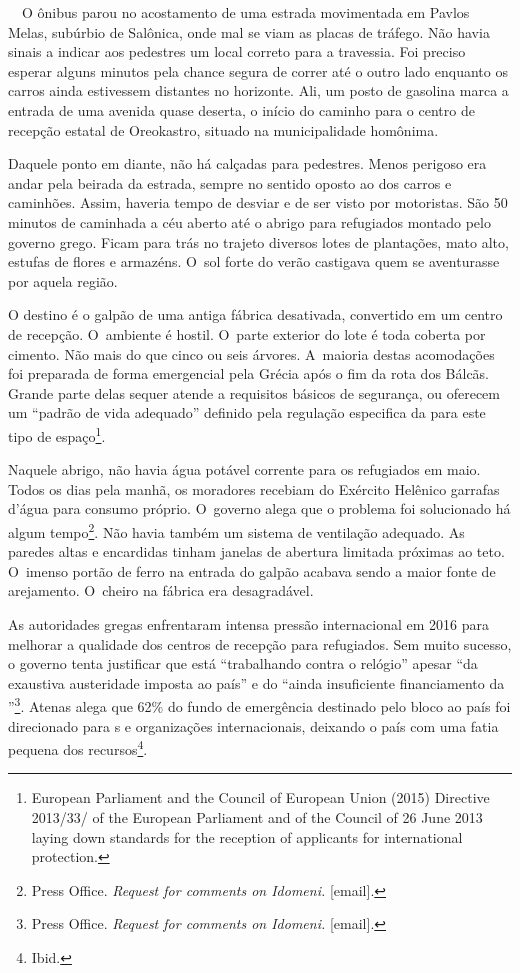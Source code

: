  
\ \
O ônibus parou no acostamento de uma estrada movimentada em Pavlos
Melas, subúrbio de Salônica, onde mal se viam as placas de tráfego. Não
havia sinais a indicar aos pedestres um local correto para a travessia.
Foi preciso esperar alguns minutos pela chance segura de correr até o
outro lado enquanto os carros ainda estivessem distantes no horizonte.
Ali, um posto de gasolina marca a entrada de uma avenida quase deserta,
o início do caminho para o centro de recepção estatal de Oreokastro,
situado na municipalidade homônima.

Daquele ponto em diante, não há calçadas para pedestres. Menos perigoso
era andar pela beirada da estrada, sempre no sentido oposto ao dos
carros e caminhões. Assim, haveria tempo de desviar e de ser visto por
motoristas. São 50 minutos de caminhada a céu aberto até o abrigo para
refugiados montado pelo governo grego. Ficam para trás no trajeto
diversos lotes de plantações, mato alto, estufas de flores e armazéns. O~sol forte do verão castigava quem se aventurasse por aquela região.

O destino é o galpão de uma antiga fábrica desativada, convertido em um
centro de recepção. O~ambiente é hostil. O~parte exterior do lote é toda
coberta por cimento. Não mais do que cinco ou seis árvores. A~maioria
destas acomodações foi preparada de forma emergencial pela Grécia após o
fim da rota dos Bálcãs. Grande parte delas sequer atende a requisitos
básicos de segurança, ou oferecem um ``padrão de vida adequado''
definido pela regulação especifica da \versal{UE} para este tipo de
espaço\footnote{ European Parliament and the Council of European
Union (2015) Directive 2013/33/\versal{EU} of the European Parliament and of the
Council of 26 June 2013 laying down standards for the reception of
applicants for international protection.}.

Naquele abrigo, não havia água potável corrente para os refugiados em
maio. Todos os dias pela manhã, os moradores recebiam do Exército
Helênico garrafas d'água para consumo próprio. O~governo alega que o
problema foi solucionado há algum tempo\footnote{ Press Office. \emph{Request for comments on
Idomeni}\emph{.} {[}email{]}.}. Não havia
também um sistema de ventilação adequado. As paredes altas e encardidas
tinham janelas de abertura limitada próximas ao teto. O~imenso portão de
ferro na entrada do galpão acabava sendo a maior fonte de arejamento. O~cheiro na fábrica era desagradável.

As autoridades gregas enfrentaram intensa pressão internacional em 2016
para melhorar a qualidade dos centros de recepção para refugiados. Sem
muito sucesso, o governo tenta justificar que está ``trabalhando contra
o relógio'' apesar ``da exaustiva austeridade imposta ao país'' e do
``ainda insuficiente financiamento da \versal{UE}''\footnote{ Press Office. \emph{Request for comments on
Idomeni}\emph{.} {[}email{]}.}. Atenas
alega que 62\% do fundo de emergência destinado pelo bloco ao país foi
direcionado para \versal{ONG}s e organizações internacionais, deixando o país com
uma fatia pequena dos recursos\footnote{ Ibid.}.

